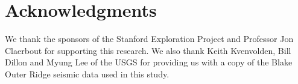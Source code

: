 \section{Acknowledgments}

We thank the sponsors of the Stanford Exploration Project and Professor Jon
Claerbout for supporting this research. We also thank Keith Kvenvolden, Bill
Dillon and Myung Lee of the USGS for providing us with a copy of the Blake
Outer Ridge seismic data used in this study.









